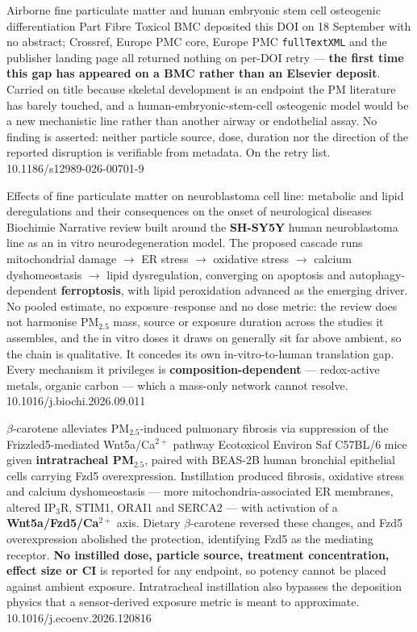 \documentclass[10pt]{article}
\begin{document}
{Airborne fine particulate matter and human embryonic stem cell osteogenic
differentiation}
{Part Fibre Toxicol}
{BMC deposited this DOI on 18 September with no abstract; Crossref, Europe PMC core,
Europe PMC \texttt{fullTextXML} and the publisher landing page all returned nothing on
per-DOI retry --- \textbf{the first time this gap has appeared on a BMC rather than an
Elsevier deposit}. Carried on title because skeletal development is an endpoint the PM
literature has barely touched, and a human-embryonic-stem-cell osteogenic model would be
a new mechanistic line rather than another airway or endothelial assay. No finding is
asserted: neither particle source, dose, duration nor the direction of the reported
disruption is verifiable from metadata. On the retry list.}
{10.1186/s12989-026-00701-9}

{Effects of fine particulate matter on neuroblastoma cell line: metabolic and lipid
deregulations and their consequences on the onset of neurological diseases}
{Biochimie}
{Narrative review built around the \textbf{SH-SY5Y} human neuroblastoma line as an in vitro
neurodegeneration model. The proposed cascade runs mitochondrial damage
$\rightarrow$ ER stress $\rightarrow$ oxidative stress $\rightarrow$ calcium dyshomeostasis
$\rightarrow$ lipid dysregulation, converging on apoptosis and autophagy-dependent
\textbf{ferroptosis}, with lipid peroxidation advanced as the emerging driver. No pooled
estimate, no exposure--response and no dose metric: the review does not harmonise
PM$_{2.5}$ mass, source or exposure duration across the studies it assembles, and the in
vitro doses it draws on generally sit far above ambient, so the chain is qualitative. It
concedes its own in-vitro-to-human translation gap. Every mechanism it privileges is
\textbf{composition-dependent} --- redox-active metals, organic carbon --- which a
mass-only network cannot resolve.}
{10.1016/j.biochi.2026.09.011}

{$\beta$-carotene alleviates PM$_{2.5}$-induced pulmonary fibrosis via suppression of the
Frizzled5-mediated Wnt5a/Ca$^{2+}$ pathway}
{Ecotoxicol Environ Saf}
{C57BL/6 mice given \textbf{intratracheal PM$_{2.5}$}, paired with BEAS-2B human bronchial
epithelial cells carrying Fzd5 overexpression. Instillation produced fibrosis, oxidative
stress and calcium dyshomeostasis --- more mitochondria-associated ER membranes, altered
IP$_3$R, STIM1, ORAI1 and SERCA2 --- with activation of a \textbf{Wnt5a/Fzd5/Ca$^{2+}$}
axis. Dietary $\beta$-carotene reversed these changes, and Fzd5 overexpression abolished
the protection, identifying Fzd5 as the mediating receptor. \textbf{No instilled dose,
particle source, treatment concentration, effect size or CI} is reported for any endpoint,
so potency cannot be placed against ambient exposure. Intratracheal instillation also
bypasses the deposition physics that a sensor-derived exposure metric is meant to
approximate.}
{10.1016/j.ecoenv.2026.120816}
\end{document}
